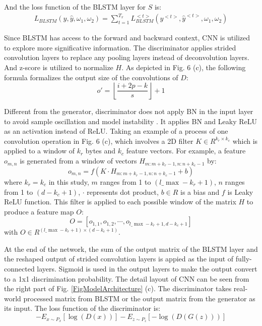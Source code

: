 And the loss function of the BLSTM layer for $S$ is:
\begin{equation}
\begin{array}{c}
{L_{BLSTM}}(y,\hat y,{\omega _1},{\omega _2}) = \sum\limits_{t = 1}^{{T_x}} {L_{BLSTM}^{ < t > }({y^{ < t > }},{{\hat y}^{ < t > }},{\omega _1},{\omega _2})} 
\end{array}
\end{equation}

Since BLSTM has access to the forward and backward context, CNN is utilized to explore more significative information. The discriminator applies strided convolution layers to replace any pooling layers instead of deconvolution layers. And z-score is utilized to normalize $H$. As depicted in Fig. 6 (c), the following formula formalizes the output size of the convolutions of $D$:
\begin{equation}
o' = \left\lfloor {\frac{{i + 2p - k}}{s}} \right\rfloor  + 1
\end{equation}

Different from the generator, discriminator does not apply BN in the input layer to avoid sample oscillation and model instability \cite{radford2015unsupervised}. It applies BN and Leaky ReLU \cite{xu2015empirical} as an activation instead of ReLU. Taking an example of a process of one convolution operation in Fig. 6 (c), which involves a 2D filter $K\in R^{{k_r} \times {k_c}}$ which is applied to a window of ${k_r}$ bytes and ${k_c}$ feature vectors. For example, a feature ${o_{m,n}}$ is generated from a window of vectors ${H_{m:m + {k_r} - 1,n:n + {k_c} - 1}}$ by:
\begin{equation}
{o_{m,n}} = f(K \cdot {H_{m:m + {k_r} - 1,n:n + {k_c} - 1}} + b)
\end{equation}
where ${k_r} = {k_c}$ in this study, $m$ ranges from 1 to $(l\_\max  - {k_r} + 1)$, $n$ ranges from 1 to $(d - {k_c} + 1)$, $\cdot$ represents dot product, $b \in R$ is a bias and $f$ is Leaky ReLU function. This filter is applied to each possible window of the matrix $H$ to produce a feature map $O$:
\begin{equation}
O = \left[ {{o_{1,1}},{o_{1,2}}, \cdots ,{o_{l\_\max  - {k_r} + 1,d - {k_c} + 1}}} \right]
\end{equation}
with $O \in R^{(l\_\max - {k_r}+1) \times (d - {k_c}+1)}$. %

At the end of the network, the sum of the output matrix of the BLSTM layer and the reshaped output of strided convolution layers is appied as the input of fully-connected layers. Sigmoid is used in the output layers to make the output convert to a 1x1 discrimination probability. The detail layout of CNN can be seen from the right part of Fig. \ref{FigModelArchitecture} (c). The discriminator takes real-world processed matrix from BLSTM or the output matrix from the generator as its input. The loss function of the discriminator is:
\begin{equation}
 - {E_{x\sim{P_x}}}\left[ {\log (D(x))} \right] - {E_{z\sim{P_z}}}\left[ { - \log (D(G(z)))} \right]
\end{equation}

